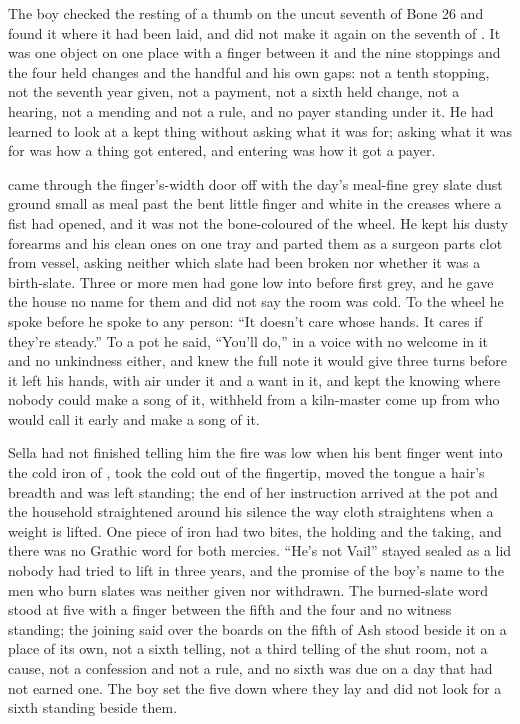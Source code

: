 The boy checked the resting of a thumb on the uncut seventh of Bone 26 and found it where it had been laid, and did not make it again on the seventh of . It was one object on one place with a finger between it and the nine stoppings and the four held changes and the handful and his own gaps: not a tenth stopping, not the seventh year given, not a payment, not a sixth held change, not a hearing, not a mending and not a rule, and no payer standing under it. He had learned to look at a kept thing without asking what it was for; asking what it was for was how a thing got entered, and entering was how it got a payer.

 came through the finger's-width door off  with the day's meal-fine grey slate dust ground small as meal past the bent little finger and white in the creases where a fist had opened, and it was not the bone-coloured  of the wheel. He kept his dusty forearms and his clean ones on one tray and parted them as a surgeon parts clot from vessel, asking neither which slate had been broken nor whether it was a birth-slate. Three or more men had gone low into  before first grey, and he gave the house no name for them and did not say the room was cold. To the wheel he spoke before he spoke to any person: “It doesn't care whose hands. It cares if they're steady.” To a pot he said, “You'll do,” in a voice with no welcome in it and no unkindness either, and knew the full note it would give three turns before it left his hands, with air under it and a want in it, and kept the knowing where nobody could make a song of it, withheld from a kiln-master come up from  who would call it early and make a song of it.

Sella had not finished telling him the fire was low when his bent finger went into the cold iron of , took the cold out of the fingertip, moved the tongue a hair's breadth and was left standing; the end of her instruction arrived at the pot and the household straightened around his silence the way cloth straightens when a weight is lifted. One piece of iron had two bites, the holding and the taking, and there was no Grathic word for both mercies. “He's not Vail” stayed sealed as a lid nobody had tried to lift in three years, and the promise of the boy's name to the men who burn slates was neither given nor withdrawn. The burned-slate word stood at five with a finger between the fifth and the four and no witness standing; the joining said over the boards on the fifth of Ash stood beside it on a place of its own, not a sixth telling, not a third telling of the shut room, not a cause, not a confession and not a rule, and no sixth was due on a day that had not earned one. The boy set the five down where they lay and did not look for a sixth standing beside them.

